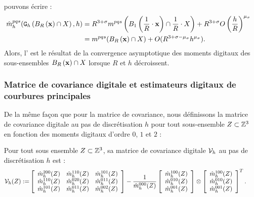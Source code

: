 pouvons écrire :
%
\begin{align} \label{eq:MomentsOnUnitaryBall-conv}
%
  \DMom{pqs}{h}(\DigF{\Ball{R}{\vx} \cap \Shape}{h},h) &= R^{3+\sigma}
  \Mom{pqs}\left( \Ball{1}{\frac{1}{R}\cdot \vx} \cap \frac{1}{R}\cdot \Shape
  \right) + R^{3+\sigma} O \left( \frac{h}{R} \right)^{\mu_{{\sigma}}}  \nonumber \\
   &= \Mom{pqs}( \Ball{R}{\vx} \cap \Shape ) + O( R^{3+{\sigma}-\mu_\sigma} h^{\mu_\sigma}).
%
\end{align}
%
Alors, l' est le résultat de la
convergence asymptotique des moments digitaux des sous-ensembles $B_{R}\left(\mathbf{x}\right)
\cap X$ lorsque $R$ et $h$ décroissent.
%
\subsubsection{Matrice de covariance digitale et estimateurs digitaux de courbures principales}
%
De la même façon que pour la matrice de covariance, nous définissons la matrice
de covariance digitale au pas de discrétisation $h$ pour tout sous-ensemble
$Z \subset \mathbb{Z}^3$ en fonction des moments digitaux d'ordre $0$, $1$ et $2$ :
%
\begin{definition}{} \label{def:DigCovMatrix-def}
%
  Pour tout sous ensemble $Z \subset \mathbb{Z}^3$, sa matrice de covariance
  digitale $\mathcal{V}_{h}$ au pas de discrétisation $h$ est :
%
  \begin{align}
%
    \DCov{h}(Z) \EqDef &\left\lbrack
        \begin{array}{ccc}
          \DMom{200}{h}(\DigShape) & \DMom{110}{h}(\DigShape) & \DMom{101}{h}(\DigShape)\\
          \DMom{110}{h}(\DigShape) & \DMom{020}{h}(\DigShape) & \DMom{011}{h}(\DigShape)\\
          \DMom{101}{h}(\DigShape) & \DMom{011}{h}(\DigShape) & \DMom{002}{h}(\DigShape)
        \end{array}
        \right\rbrack
        - \frac{1}{\DMom{000}{h}(\DigShape)}
        \left\lbrack
        \begin{array}{c}
          \DMom{100}{h}(\DigShape) \\
          \DMom{010}{h}(\DigShape) \\
          \DMom{001}{h}(\DigShape) \\
        \end{array}
        \right\rbrack
        \otimes
        \left\lbrack
        \begin{array}{c}
          \DMom{100}{h}(\DigShape) \\
          \DMom{010}{h}(\DigShape) \\
          \DMom{001}{h}(\DigShape) \\
        \end{array}
        \right\rbrack^T.
%
  \end{align}
%
\end{definition}
